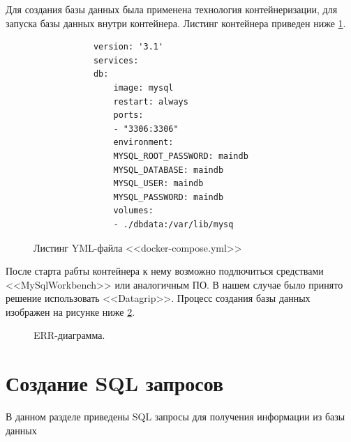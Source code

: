 \documentclass[14pt]{extreport}
\begin{document}
    Для создания базы данных была применена технология контейнеризации, для запуска базы данных внутри контейнера.%
    Листинг контейнера приведен ниже \ref{docker}.
    
    

    \begin{figure}[H]
        \begin{verbatim}
            version: '3.1'
            services:
            db:
                image: mysql
                restart: always
                ports:
                - "3306:3306"
                environment:
                MYSQL_ROOT_PASSWORD: maindb
                MYSQL_DATABASE: maindb
                MYSQL_USER: maindb
                MYSQL_PASSWORD: maindb
                volumes:
                - ./dbdata:/var/lib/mysq
        \end{verbatim}
        \caption{Листинг YML-файла <<docker-compose.yml>>}
        \label{docker}
    \end{figure}

    После старта рабты контейнера к нему возможно подлючиться средствами <<MySqlWorkbench>> или аналогичным ПО. %
    В нашем случае было принято решение использовать <<Datagrip>>. Процесс создания базы данных изображен на рисунке ниже \ref{create_db}.

    \begin{figure}[H]%
        \centering
        \caption{ERR-диаграмма.}
        \label{create_db} 
    \end{figure}


    
\section{Создание SQL запросов}
    В данном разделе приведены SQL запросы для получения информации из базы данных
\end{document}

